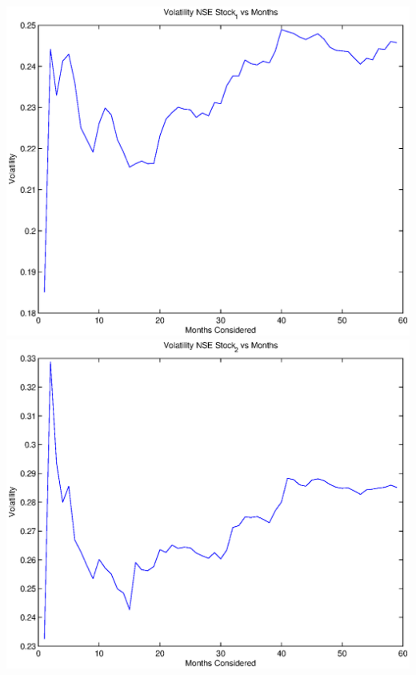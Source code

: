 \documentclass{article}
\begin{document}
\includegraphics[width=\textwidth]{Volatility_NSE_Stock_1_vs_Months} \\

\includegraphics[width=\textwidth]{Volatility_NSE_Stock_2_vs_Months} \\
\end{document}
